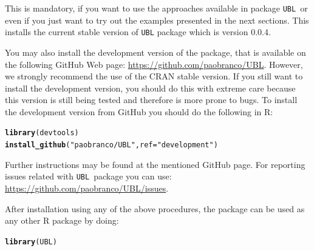 \documentclass[10pt,a4paper]{article}\usepackage[]{graphicx}\usepackage[]{color}
\makeatletter
\newcommand{\hlstr}[1]{\textcolor[rgb]{0.192,0.494,0.8}{#1}}%
\newcommand{\hlstd}[1]{\textcolor[rgb]{0.345,0.345,0.345}{#1}}%
\newcommand{\hlkwc}[1]{\textcolor[rgb]{0.333,0.667,0.333}{#1}}%
\newcommand{\hlkwd}[1]{\textcolor[rgb]{0.737,0.353,0.396}{\textbf{#1}}}%
\newenvironment{kframe}{%
 \def\at@end@of@kframe{}%
 \ifinner\ifhmode%
  \def\at@end@of@kframe{\end{minipage}}%
  \begin{minipage}{\columnwidth}%
 \fi\fi%
 \def\FrameCommand##1{\hskip\@totalleftmargin \hskip-\fboxsep
 \colorbox{shadecolor}{##1}\hskip-\fboxsep
     \hskip-\linewidth \hskip-\@totalleftmargin \hskip\columnwidth}%
 \MakeFramed {\advance\hsize-\width
   \@totalleftmargin\z@ \linewidth\hsize
   \@setminipage}}%
 {\par\unskip\endMakeFramed%
 \at@end@of@kframe}
\newenvironment{knitrout}{}{} %
\newcommand{\pUBL}{package \texttt{UBL}\ }
\newcommand{\UBLp}{\texttt{UBL}\ package  }
\newcommand{\version}{0.0.4}
\makeatother
\begin{document}
This is mandatory, if you want to use the approaches available in \pUBL or even if you just want to try out the examples presented in the next sections. This installs the current stable version of \texttt{UBL} package which is version \version.

You may also install the development version of the package, that is available on the following GitHub Web page: \url{https://github.com/paobranco/UBL}. However, we strongly recommend the use of the CRAN stable version. If you still want to install the development version, you should do this with extreme care because this version is still being tested and therefore is more prone to bugs.
To install the development version from GitHub you should do the following in R:

\begin{knitrout}\footnotesize
{}\color{fgcolor}\begin{kframe}
\begin{alltt}
\hlkwd{library}\hlstd{(devtools)}
\hlkwd{install_github}\hlstd{(}\hlstr{"paobranco/UBL"}\hlstd{,}\hlkwc{ref}\hlstd{=}\hlstr{"development"}\hlstd{)}
\end{alltt}
\end{kframe}
\end{knitrout}

Further instructions may be found at the mentioned GitHub page. 
For reporting issues related with \UBLp you can use: \url{https://github.com/paobranco/UBL/issues}.


After installation using any of the above procedures, the package can be used as any other R package by doing:

\begin{knitrout}\footnotesize
{}\color{fgcolor}\begin{kframe}
\begin{alltt}
\hlkwd{library}\hlstd{(UBL)}
\end{alltt}
\end{kframe}
\end{knitrout}

\end{document}
